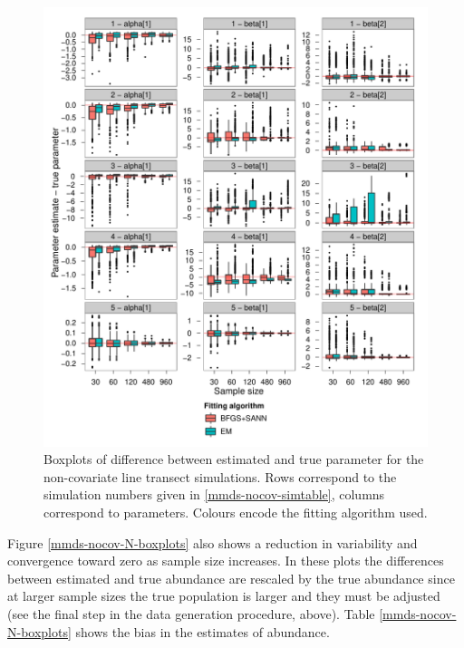 \begin{figure}[hp]
\centering
\includegraphics[width=7in]{mix/figs/nocov-boxplots.pdf}
\caption{Boxplots of difference between estimated and true parameter for the non-covariate line transect simulations. Rows correspond to the simulation numbers given in \ref{mmds-nocov-simtable}, columns correspond to parameters. Colours encode the fitting algorithm used.}
\label{mmds-nocov-boxplots}
\end{figure}

Figure \ref{mmds-nocov-N-boxplots} also shows a reduction in variability and convergence toward zero as sample size increases. In these plots the differences between estimated and true abundance are rescaled by the true abundance since at larger sample sizes the true population is larger and they must be adjusted (see the final step in the data generation procedure, above). Table \ref{mmds-nocov-N-boxplots} shows the bias in the estimates of abundance. 

